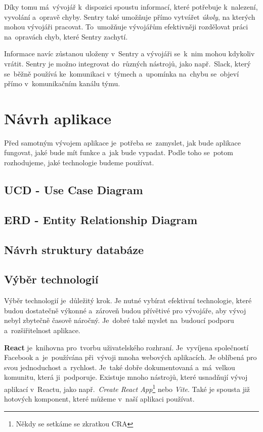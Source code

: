 \documentclass[14pt,a4paper]{article}
\begin{document}
            Díky tomu má~vývojář k~dispozici spoustu informací, které potřebuje k~nalezení, vyvolání a~opravě chyby.
            Sentry také umožňuje přímo vytvářet \emph{úkoly}, na kterých mohou vývojáři pracovat.
            To~umožňuje vývojářům efektivněji rozdělovat práci na~opravách chyb, které Sentry zachytí.

            Informace navíc zůstanou uloženy v~Sentry a vývojáři se~k~nim mohou kdykoliv vrátit.
            Sentry je možno integrovat do~různých nástrojů, jako např.~Slack, který se~běžně používá ke~komunikaci v~týmech
            a~upomínka na~chybu se~objeví přímo v~komunikačním kanálu týmu.
	
	\section{Návrh aplikace}
        Před samotným vývojem aplikace je~potřeba se~zamyslet, jak bude aplikace fungovat, jaké bude mít funkce a~jak bude vypadat. Podle toho se~potom rozhodujeme, jaké technologie budeme používat.

        \subsection{UCD - Use Case Diagram}
        \subsection{ERD - Entity Relationship Diagram}
        \subsection{Návrh struktury databáze}
        \subsection{Výběr technologií}
            Výběr technologií je~důležitý krok. Je nutné vybírat efektivní technologie, které budou dostatečně výkonné a~zároveň budou
            přívětivé pro vývojáře, aby vývoj nebyl zbytečně časově náročný. Je~dobré také myslet na~budoucí podporu a~rozšiřitelnost aplikace.

            \textbf{React} je~knihovna pro~tvorbu uživatelského rozhraní. Je~vyvíjena společností Facebook a~je~používána při~vývoji mnoha webových aplikacích.
            Je oblíbená pro svou jednoduchost a~rychlost. Je~také dobře dokumentovaná a~má~velkou komunitu, která ji~podporuje.
            Existuje mnoho nástrojů, které usnadňují vývoj aplikací v~Reactu, jako
            např.~\emph{Create React App}\footnote{Někdy se setkáme se zkratkou CRA} nebo \emph{Vite}.
            Také je spousta již hotových komponent, které můžeme v~naší aplikaci používat.
\end{document}

